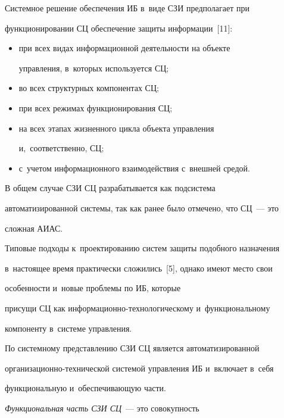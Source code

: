     

    Системное решение обеспечения ИБ в~виде СЗИ предполагает при 

функционировании СЦ обеспечение защиты информации~[11]:

    \begin{itemize}

    \item при всех видах информационной деятельности на объекте 

управления, в~которых используется СЦ;

    \item во всех структурных компонентах СЦ;

    \item при всех режимах функционирования СЦ;

    \item на всех этапах жизненного цикла объекта управления 

и,~соответственно, СЦ;

    \item  с~учетом информационного взаимодействия с~внешней средой.

    \end{itemize}

    

    В общем случае СЗИ СЦ разрабатывается как под\-сис\-те\-ма 

автоматизированной сис\-те\-мы, так как ранее было отмечено, что СЦ~--- это 

сложная АИАС. 

Типовые подходы к~проектированию сис\-тем защиты подобного назначения 

в~настоящее время практически сложились~[5], однако имеют место свои 

особенности и~новые проблемы по ИБ, которые 

присущи СЦ как ин\-фор\-ма\-ци\-он\-но-тех\-но\-ло\-ги\-че\-ско\-му и~функциональному 

компоненту в~сис\-те\-ме управ\-ления. 

    

    По системному представлению СЗИ СЦ является автоматизированной 

ор\-га\-ни\-за\-ци\-он\-но-тех\-ни\-че\-ской сис\-те\-мой управ\-ле\-ния ИБ и~включает в~себя 

функциональную и~обеспечивающую части. 

    

    \textit{Функциональная часть СЗИ СЦ}~--- это совокупность 

